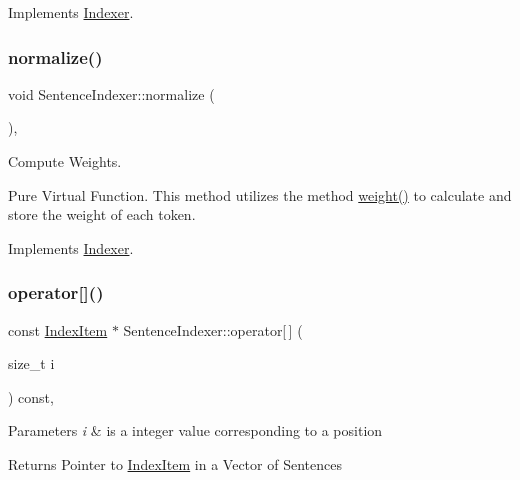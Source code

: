 Implements \hyperlink{class_indexer_aadcdca40938d27c465e564ac8852f02d}{Indexer}.

\mbox{\label{class_sentence_indexer_ae038d36081439a5107821ac48a318d66}} 
\subsubsection{\texorpdfstring{normalize()}{normalize()}}
{\footnotesize\ttfamily void Sentence\+Indexer\+::normalize (\begin{DoxyParamCaption}{ }\end{DoxyParamCaption})\hspace{0.3cm}{\ttfamily [override]}, {\ttfamily [virtual]}}



Compute Weights. 

Pure Virtual Function. This method utilizes the method \hyperlink{class_sentence_indexer_ad436ab76195615090de457b50aabfe7b}{weight()} to calculate and store the weight of each token. 

Implements \hyperlink{class_indexer_a84f50c7bac96cd5a8daa18899a39bb5d}{Indexer}.

\mbox{\label{class_sentence_indexer_adcc5897caef051a20a2ef6e767989d88}} 
\subsubsection{\texorpdfstring{operator[]()}{operator[]()}}
{\footnotesize\ttfamily const \hyperlink{class_index_item}{Index\+Item} $\ast$ Sentence\+Indexer\+::operator\mbox{[}$\,$\mbox{]} (\begin{DoxyParamCaption}\item[{size\+\_\+t}]{i }\end{DoxyParamCaption}) const\hspace{0.3cm}{\ttfamily [override]}, {\ttfamily [virtual]}}


\begin{DoxyParams}{Parameters}
{\em i} & is a integer value corresponding to a position \\
\hline
\end{DoxyParams}
\begin{DoxyReturn}{Returns}
Pointer to \hyperlink{class_index_item}{Index\+Item} in a Vector of Sentences 
\end{DoxyReturn}


